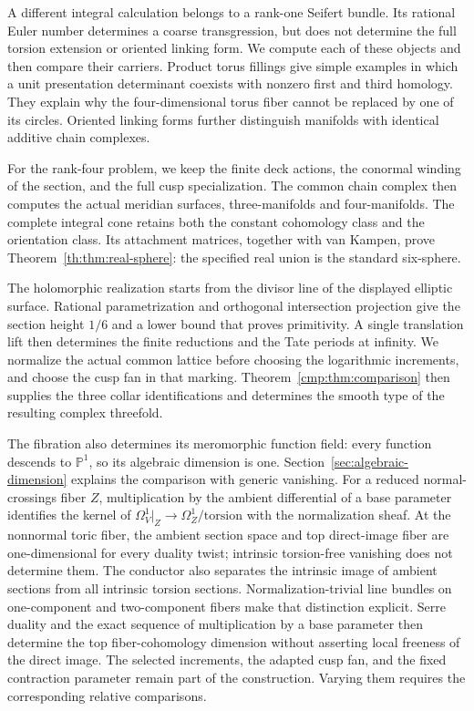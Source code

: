 \documentclass[11pt]{article}
\numberwithin{equation}{section}
\begin{document}
A different integral calculation belongs to a rank-one Seifert
bundle. Its rational Euler number determines a coarse transgression,
but does not determine the full torsion extension or oriented linking
form. We compute each of these objects and then compare their
carriers. Product torus fillings give simple examples in which a unit
presentation determinant coexists with nonzero first and third
homology. They explain why the four-dimensional torus fiber cannot
be replaced by one of its circles.
Oriented linking forms further distinguish manifolds with identical
additive chain complexes.

For the rank-four problem, we keep the finite deck actions, the
conormal winding of the section, and the full cusp specialization.
The common chain complex then computes the actual meridian surfaces,
three-manifolds and four-manifolds. The complete integral cone retains
both the constant cohomology class and the orientation class.
Its attachment matrices, together with van Kampen, prove
Theorem~\ref{th:thm:real-sphere}: the specified real union is the
standard six-sphere.

The holomorphic realization
starts from the divisor line of the displayed elliptic surface.
Rational parametrization and orthogonal intersection projection give
the section height $1/6$ and a lower bound that proves primitivity.
A single translation lift then determines the finite reductions and
the Tate periods at infinity. We normalize the actual common lattice
before choosing the logarithmic increments, and choose the cusp fan
in that marking. Theorem~\ref{cmp:thm:comparison} then supplies the
three collar identifications and determines the smooth type of the
resulting complex threefold.

The fibration also determines its meromorphic function field: every
function descends to $\mathbb P^1$, so its algebraic dimension is one.
Section~\ref{sec:algebraic-dimension} explains the comparison with generic vanishing.
For a reduced normal-crossings fiber $Z$, multiplication by the
ambient differential of a base parameter identifies the kernel of
$\Omega_V^1|_Z\to\Omega_Z^1/\mathrm{torsion}$ with the normalization
sheaf. At the nonnormal toric fiber, the ambient section space
and top direct-image fiber are one-dimensional for every duality
twist; intrinsic torsion-free vanishing does not determine them.
The conductor also separates the intrinsic image of ambient sections
from all intrinsic torsion sections.
Normalization-trivial line bundles on one-component and
two-component fibers make that distinction explicit. Serre duality
and the exact sequence of multiplication by a base parameter then
determine the top fiber-cohomology dimension without asserting local
freeness of the direct image. The selected increments, the adapted cusp fan,
and the fixed contraction parameter remain part of the construction.
Varying them requires the corresponding relative comparisons.
\end{document}
